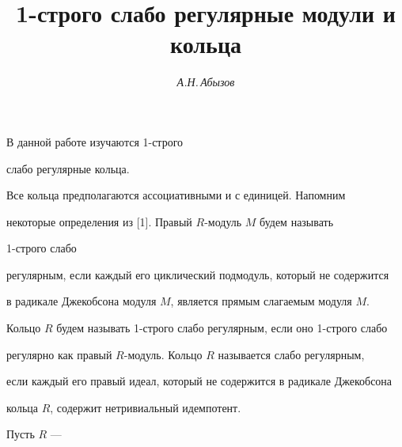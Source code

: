  


\author{\it А.Н.\,Абызов} 




\title{1-строго слабо регулярные модули и кольца} 


 


\date{} 




\pagestyle{plain} %


 




\maketitle 


\label{begin} 


 


 








 


В данной работе изучаются 1-строго  


слабо регулярные кольца.


Все кольца предполагаются ассоциативными и с единицей. Напомним 


некоторые определения из [1]. Правый $R$-модуль $M$ будем называть 


1-строго слабо  


регулярным, если каждый его циклический подмодуль, который не содержится  


в радикале Джекобсона модуля $M$, является прямым слагаемым модуля $M$.  


Кольцо $R$ будем называть 1-строго слабо регулярным, если оно 1-строго слабо  


регулярно как правый $R$-модуль. Кольцо $R$ называется слабо регулярным,  


если каждый его правый идеал, который не содержится в радикале Джекобсона  


кольца $R$, содержит нетривиальный идемпотент. 


 


Пусть $R$ --- 


